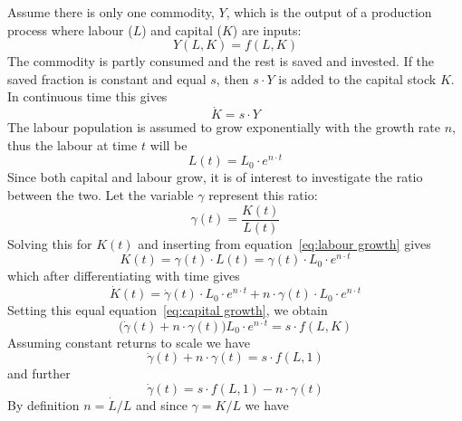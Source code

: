 \documentclass[11pt,fleqn]{book} %
\begin{document}
Assume there is only one commodity, $Y$, which is the output of a production process where labour ($L$) and capital ($K$) are inputs:
\begin{equation} 
\label{eq:prod3}
Y(L, K) = f(L, K)
\end{equation}
The commodity is partly consumed and the rest is saved and invested. If the saved fraction is constant and equal $s$, then $s \cdot Y$ is added to the capital stock $K$. In continuous time this gives
\begin{equation} 
\label{eq:capital growth}
\dot{K} = s \cdot Y
\end{equation}
The labour population is assumed to grow exponentially with the growth rate $n$, thus the labour at time $t$ will be
\begin{equation} 
\label{eq:labour growth}
L(t) = L_0 \cdot e^{n\cdot t}
\end{equation}
Since both capital and labour grow, it is of interest to investigate the ratio between the two. Let the variable $\gamma$ represent this ratio:
\begin{equation} 
\label{eq:factor ratio}
\gamma(t) = \frac{K(t)}{L(t)}
\end{equation}
Solving this for $K(t)$ and inserting from equation~\ref{eq:labour growth} gives
\begin{equation} 
\label{eq:factor ratio1}
K(t) = \gamma(t) \cdot L(t) = \gamma(t) \cdot L_0 \cdot e^{n\cdot t}
\end{equation}
which after differentiating with time gives
\begin{equation} 
\label{eq:factor ratio2}
\dot{K}(t) = \dot{\gamma}(t) \cdot L_0 \cdot e^{n\cdot t} + n \cdot \gamma(t) \cdot L_0 \cdot e^{n\cdot t}
\end{equation}
Setting this equal equation~\ref{eq:capital growth}, we obtain
\begin{equation} 
\label{eq:factor ratio3}
\Big( \dot{\gamma}(t) + n \cdot \gamma(t) \Big) L_0 \cdot e^{n\cdot t} = s \cdot f(L, K)
\end{equation}
Assuming constant returns to scale we have
\begin{equation} 
\label{eq:factor ratio4}
\dot{\gamma}(t) + n \cdot \gamma(t) = s \cdot f(L, 1)
\end{equation}
and further
\begin{equation} 
\label{eq:factor ratio5}
\dot{\gamma}(t) = s \cdot f(L, 1) - n \cdot \gamma(t)
\end{equation}
By definition $n = \dot{L}/L$ and since $\gamma = K/L$ we have
\end{document}
